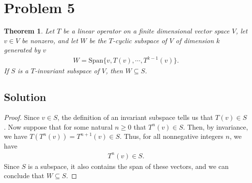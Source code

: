\documentclass[10pt,a4paper]{article}
\author{Jeremiah Givens}
\newtheorem{theorem}{Theorem}
\theoremstyle{definition}
\begin{document}
\section*{Problem 5}
\begin{theorem}
Let $T$ be a linear operator on a finite dimensional vector space $V$, let $v \in V$ be nonzero, and let $W$ be the $T$-cyclic subspace of $V$ of dimension $k$ generated by $v$
\begin{align*}
W = \text{Span} \{v, T(v),\cdots, T^{k-1}(v) \}.
\end{align*} 
If $S$ is a $T$-invariant subspace of $V$, then $W \subseteq S$.
\end{theorem}

\subsection*{Solution}
\begin{proof}
Since $v \in S$, the definition of an invariant subspace tells us that $T(v) \in S$. Now suppose that for some natural $n \geq 0$ that $T^n(v) \in S$. Then, by invariance, we have $T(T^n(v)) = T^{n + 1}(v) \in S$. Thus, for all nonnegative integers $n$, we have
\begin{align*}
T^n(v) \in S.
\end{align*}
Since $S$ is a subspace, it also contains the span of these vectors, and we can conclude that $W \subseteq S$.
\end{proof}
\end{document}
